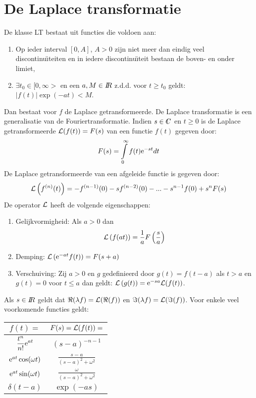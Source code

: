 \section{De Laplace transformatie}
De klasse LT bestaat uit functies die voldoen aan:
\begin{enumerate}
\item Op ieder interval $[0,A]$, $A>0$ zijn niet meer dan eindig veel
      discontinu\"{\i}teiten en in iedere discontinu\"{\i}teit bestaan de
      boven- en onder limiet,
\item $\exists t_0\in[0,\infty>$ en een $a,M\in I\hspace{-1mm}R$ z.d.d. voor $t\geq t_0$
      geldt: $|f(t)|\exp(-at)<M$.
\end{enumerate}
Dan bestaat voor $f$ de Laplace getransformeerde.
\npar
De Laplace transformatie is een generalisatie van de Fouriertransformatie.
Indien $s\in\CC$ en $t\geq0$ is de Laplace getransformeerde
${\cal L}(f(t))=F(s)$ van een functie $f(t)$ gegeven door:
\[
F(s)=\int\limits_0^\infty f(t){\rm e}^{-st}dt
\]
De Laplace getransformeerde van een afgeleide functie is gegeven door:
\[
{\cal L}\left(f^{(n)}(t)\right)=-f^{(n-1)}(0)-sf^{(n-2)}(0)-...-s^{n-1}f(0)+s^nF(s)
\]
De operator $\cal L$ heeft de volgende eigenschappen:
\begin{enumerate}
\item Gelijkvormigheid: Als $a>0$ dan
\[
{\cal L}\left(f(at)\right)=\frac{1}{a}F\left(\frac{s}{a}\right)
\]
\item Demping: ${\cal L}\left({\rm e}^{-at}f(t)\right)=F(s+a)$
\item Verschuiving: Zij $a>0$ en $g$ gedefinieerd door $g(t)=f(t-a)$ als
$t>a$ en $g(t)=0$ voor $t\leq a$ dan geldt:
${\cal L}\left(g(t)\right)={\rm e}^{-sa}{\cal L}(f(t))$.
\end{enumerate}
Als $s\in I\hspace{-1mm}R$ geldt dat $\Re(\lambda f)={\cal L}(\Re(f))$ en
$\Im(\lambda f)={\cal L}(\Im(f))$.
\npar
Voor enkele veel voorkomende functies geldt:
\begin{center}
\begin{tabular}{||c||c||}
\hline
$f(t)=$&$F(s)={\cal L}(f(t))=$\\
\hline
\hline
$\displaystyle\frac{t^n}{n!}{\rm e}^{at}$&$(s-a)^{-n-1}$\rule{0pt}{15pt}\\
${\rm e}^{at}\cos(\omega t)$&$\displaystyle\frac{s-a}{(s-a)^2+\omega^2}$\rule{0pt}{15pt}\\
${\rm e}^{at}\sin(\omega t)$&$\displaystyle\frac{\omega}{(s-a)^2+\omega^2}$\rule{0pt}{15pt}\\
$\delta(t-a)$&$\exp(-as)$\rule{0pt}{13pt}\\
\hline
\end{tabular}
\end{center}

